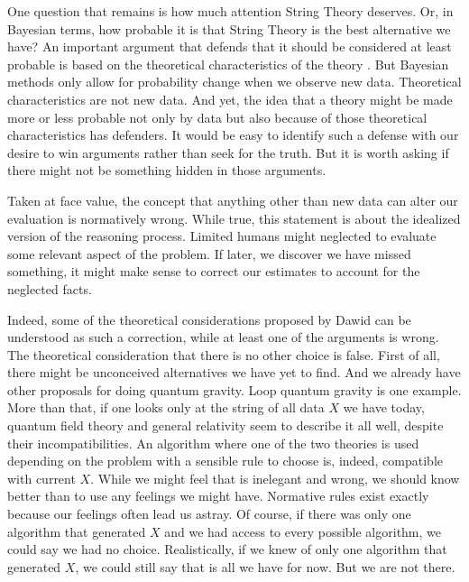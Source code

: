 \documentclass{article}
\begin{document}
	
	
	One question that remains is how much attention String Theory deserves. Or, in Bayesian terms, how probable it is that String Theory is the best alternative we have? An important argument that defends that it should be considered at least probable is based on the theoretical characteristics of the theory \cite{dawid06a,dawid13a}. But Bayesian methods only allow for probability change when we observe new data. Theoretical characteristics are not new data. And yet, the idea that a theory might be made more or less probable not only by data but also because of those theoretical characteristics has defenders.  It would be easy to identify such a defense with our desire to win arguments rather than seek for the truth. But it is worth asking if there might not be something hidden in those arguments.
	
	
	
	
	
	Taken at face value, the concept that anything other than new data can alter our evaluation is normatively wrong. While true, this statement is about the idealized version of the reasoning process. Limited humans might neglected to evaluate some relevant aspect of the problem. If later, we discover we have missed something, it might make sense to correct our estimates to account for the neglected facts. 
	
	
	Indeed, some of the theoretical considerations proposed by Dawid \cite{dawid06a} can be understood as such a correction, while at least one of the arguments is wrong. The theoretical consideration that there is no other choice is false. First of all, there might be unconceived alternatives \cite{stanford01a} we have yet to find. And we already have other proposals for doing quantum gravity. Loop quantum gravity  is one example\cite{rovellismolin90}. More than that, if one looks only at the string of all data $X$ we have today, quantum field theory and general relativity seem to describe it all well, despite their incompatibilities. An algorithm where one of the two theories is used depending on the problem with a sensible rule to choose is, indeed, compatible with current $X$. While we might feel that is inelegant and wrong, we should know better than to use any feelings we might have. Normative rules exist exactly because our feelings often lead us astray. Of course, if there was only one algorithm that generated $X$ and we had access to every possible algorithm, we could say we had no choice. Realistically, if we knew of only one algorithm that generated $X$, we could still say that is all we have for now. But we are not there.
	
\end{document}
